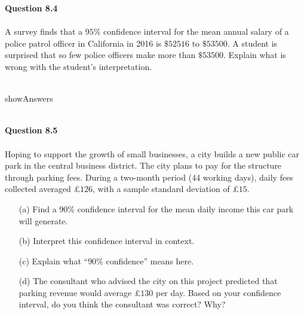\documentclass{article}
\begin{document}
%
{\bf Question 8.4}
~\\~\\
A survey finds that a $95\%$ confidence interval for the mean annual salary of a police patrol officer in California in 2016 is $\$52516$ to $\$53500$. A student is surprised that so few police officers make more than $\$53500$. Explain what is wrong with the student's interpretation.
~\\~\\
\begin{maybePrint}{showAnswers}
\color{red}{
First of all, a single confidence interval should be used carefully when making conclusions. Another person with a different sample can get a very different confidence interval. 

Secondly, The student has taken the interval given as a statement about the distribution of salaries. Since a small part of the interval lies above $\$53500$, they have concluded that few of the salaries lie above $\$53500$. However, this is not what the result is saying.

The confidence interval records what is known about the position of the mean, but does not tell us about the spread of the values around the mean.  It might be that most of those in the survey earn more than $\$53500$, but the mean was pulled down by a number of voluntary staff. On the other hand, there could be a lot of staff with salaries around $\$52500$, and a small number who are more highly paid. A range of different situations could lead to the same confidence interval. 
}
~\\~\\
\end{maybePrint}
%
%
{\bf Question 8.5}
~\\~\\
Hoping to support the growth of small businesses, a city builds a new public car park in the central business district. The city plans to pay for the structure through parking fees. During a two-month period (44 working days), daily fees collected averaged £$126$, with a sample standard deviation of £$15$.
\begin{enumerate}
\item[(a)] Find a $90\%$ confidence interval for the mean daily income this car park will generate.
\item[(b)] Interpret this confidence interval in context.
\item[(c)] Explain what ``$90\%$ confidence'' means here.
\item[(d)] The consultant who advised the city on this project predicted  that parking revenue would average £$130$ per day. Based on your confidence interval, do you think the consultant was correct?  Why? 
\end{enumerate}
\end{document}
